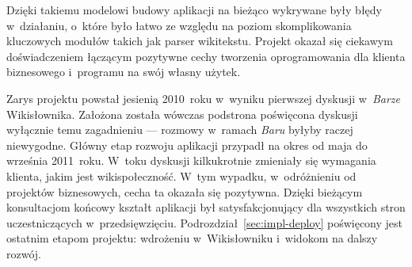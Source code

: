 Dzięki takiemu modelowi budowy aplikacji na bieżąco wykrywane były błędy w~działaniu, o~które było łatwo ze względu na poziom skomplikowania kluczowych modułów takich jak parser wikitekstu. Projekt okazał się ciekawym doświadczeniem łączącym pozytywne cechy tworzenia oprogramowania dla klienta biznesowego i~programu na swój własny użytek.

Zarys projektu powstał jesienią 2010~roku w~wyniku pierwszej dyskusji w~\emph{Barze} Wikisłownika. Założona została wówczas podstrona poświęcona dyskusji wyłącznie temu zagadnieniu --- rozmowy w~ramach \emph{Baru} byłyby raczej niewygodne. Główny etap rozwoju aplikacji przypadł na okres od maja do września 2011~roku. W~toku dyskusji kilkukrotnie zmieniały się wymagania klienta, jakim jest wikispołeczność. W~tym wypadku, w~odróżnieniu od projektów biznesowych, cecha ta okazała się pozytywna. Dzięki bieżącym konsultacjom końcowy kształt aplikacji był satysfakcjonujący dla wszystkich stron uczestniczących w~przedsięwzięciu. Podrozdział~\ref{sec:impl-deploy} poświęcony jest ostatnim etapom projektu: wdrożeniu w~Wikisłowniku i~widokom na dalszy rozwój.
